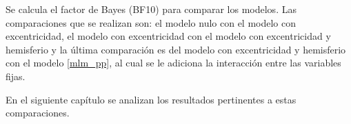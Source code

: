 Se calcula el factor de Bayes (BF10) para comparar los modelos. Las comparaciones que se realizan son: el modelo nulo con el modelo con excentricidad, el modelo con excentricidad con el modelo con excentricidad y hemisferio y la \'ultima comparaci\'on es del modelo con excentricidad y hemisferio con el modelo \ref{mlm_pp}, al cual se le adiciona la interacci\'on entre las variables fijas.

En el siguiente cap\'itulo se analizan los resultados pertinentes a estas comparaciones.









